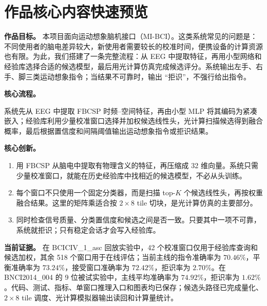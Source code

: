 \documentclass[
    TwoSide=false,
    Degree=graduate,
    GradLevel=master,
    Type=thesis,
    Title={光电混合运动想象脑机接口技术文档}
]{zjuthesis}
\begin{document}


\prevstyle
\chapter*{作品核心内容快速预览}
\noindent\textbf{作品目标。} 本项目面向运动想象脑机接口（MI-BCI）。这类系统常见的问题是：不同使用者的脑电差异较大，新使用者需要较长的校准时间，便携设备的计算资源也有限。为此，我们搭建了一条完整流程：从 EEG 中提取特征，再用小型网络和经验库选择合适的候选模型，最后用光计算仿真完成候选评分。系统输出左手、右手、脚三类运动想象指令；当结果不可靠时，输出 ``拒识''，不强行给出指令。

\vspace{0.35cm}
\noindent\textbf{核心流程。}
\begin{center}
\end{center}

\vspace{0.15cm}
\noindent 系统先从 EEG 中提取 FBCSP 时频--空间特征，再由小型 MLP 将其编码为紧凑嵌入；经验库利用少量校准窗口选择并加权候选线性头，光计算扫描候选得到融合概率，最后根据置信度和间隔阈值输出运动想象指令或拒识结果。

\vspace{0.35cm}
\noindent\textbf{核心创新。}
\begin{enumerate}[leftmargin=2.2em,itemsep=0.15em]
  \item 用 FBCSP 从脑电中提取有物理含义的特征，再压缩成 32 维向量。系统只需少量校准窗口，就能在历史经验库中找相近的候选模型，不必从头训练。
  \item 每个窗口不只使用一个固定分类器，而是扫描 top-$K$ 个候选线性头，再按权重融合结果。这里的矩阵乘适合按 $2\times8$ tile 切块，是光计算仿真的主要部分。
  \item 同时检查信号质量、分类置信度和候选之间是否一致。只要其中一项不可靠，系统就拒识；只有稳定会话才会写入经验库。
\end{enumerate}

\vspace{0.2cm}
\noindent\textbf{当前证据。} 在 BCICIV\_1\_asc 回放实验中，42 个校准窗口仅用于经验库查询和候选加权，其余 518 个窗口用于在线评估；当前主线的指令准确率为 $70.46\%$，平衡准确率为 $73.24\%$，接受窗口准确率为 $72.42\%$，拒识率为 $2.70\%$。在 BNCI2014\_004 的 9 位被试实验中，主线平均准确率为 $74.92\%$，拒识率为 $1.62\%$。代码、测试、指标、单窗口推理入口和图表均已保存；候选头路径已完成量化、$2\times8$ tile 调度、光计算模拟器输出读回和计算量统计。
\end{document}
